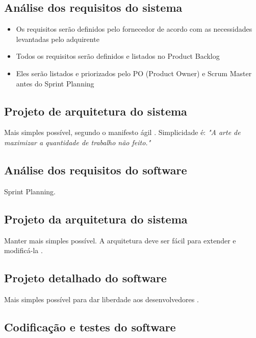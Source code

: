 \subsection{Análise dos requisitos do sistema}

\begin{itemize}
  \item Os requisitos serão definidos pelo fornecedor de acordo com as necessidades levantadas pelo adquirente

  \item Todos os requisitos serão definidos e listados no Product Backlog

  \item Eles serão listados e priorizados pelo PO (Product Owner) e Scrum Master antes do Sprint Planning
\end{itemize}

\subsection{Projeto de arquitetura do sistema}

Mais simples possível, segundo o manifesto ágil \cite{beck2001agile, BecAnd04extreme}. Simplicidade é:
\emph{"A arte de maximizar a quantidade de trabalho não feito."}


\subsection{Análise dos requisitos do software}

Sprint Planning.

\subsection{Projeto da arquitetura do sistema}

Manter mais simples possível. A arquitetura deve ser fácil para extender e modificá-la \cite{beck2001agile, BecAnd04extreme}.

\subsection{Projeto detalhado do software}

Mais simples possível para dar liberdade aos desenvolvedores \cite{beck2001agile, BecAnd04extreme}.

\subsection{Codificação e testes do software}

